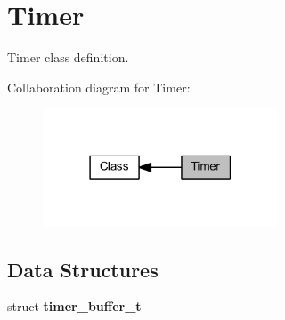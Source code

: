 \section{Timer}
\label{group___timer}


Timer class definition.  


Collaboration diagram for Timer\+:
\nopagebreak
\begin{figure}[H]
\begin{center}
\leavevmode
\includegraphics[width=198pt]{group___timer}
\end{center}
\end{figure}
\subsection*{Data Structures}
\begin{DoxyCompactItemize}
\item 
struct \textbf{ timer\+\_\+buffer\+\_\+t}
\end{DoxyCompactItemize}

